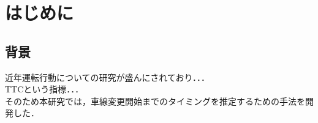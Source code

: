 \chapter{はじめに}
 \section{背景}
近年運転行動についての研究が盛んにされており．．．
\\
TTCという指標．．．
\\
そのため本研究では，車線変更開始までのタイミングを推定するための手法を開発した．
\\
